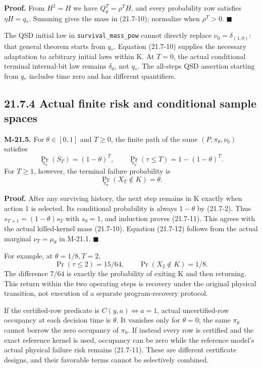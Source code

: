\documentclass[
  english,
  11pt,
  oneside]{book}
\begin{document}
\textbf{Proof.} From \(H^2=H\) we have \(Q_\theta^T=\rho^TH\), and every probability row satisfies \(\eta H=q_*\). Summing gives the mass in (21.7-10); normalize when \(\rho^T>0\). \(\blacksquare\)

The QSD initial law in \nolinkurl{survival_mass_pow} cannot directly replace \(\nu_0=\delta_{(1,0)}\): that general theorem starts from \(q_*\). Equation (21.7-10) supplies the necessary adaptation to arbitrary initial laws within K. At \(T=0\), the actual conditional terminal internal-bit law remains \(\delta_0\), not \(q_*\). The all-steps QSD assertion starting from \(q_*\) includes time zero and has different quantifiers.

\subsection{21.7.4 Actual finite risk and conditional sample spaces}\label{actual-finite-risk-and-conditional-sample-spaces}

\hypertarget{m-21-5}{}\label{m-21-5}

\textbf{M-21.5.} For \(\theta\in[0,1]\) and \(T\ge0\), the finite path of the same \((P,\pi_\theta,\nu_0)\) satisfies \[\Pr_{\pi_\theta}(S_T)=(1-\theta)^T,\qquad
\Pr_{\pi_\theta}(\tau\le T)=1-(1-\theta)^T.           \tag{21.7-11}\] For \(T\ge1\), however, the terminal failure probability is \[\Pr_{\pi_\theta}(X_T\notin K)=\theta.                \tag{21.7-12}\]

\textbf{Proof.} After any surviving history, the next step remains in K exactly when action 1 is selected. Its conditional probability is always \(1-\theta\) by (21.7-2). Thus \(s_{T+1}=(1-\theta)s_T\) with \(s_0=1\), and induction proves (21.7-11). This agrees with the actual killed-kernel mass (21.7-10). Equation (21.7-12) follows from the actual marginal \(\nu_T=\mu_\theta\) in M-21.1. \(\blacksquare\)

For example, at \(\theta=1/8,T=2\), \[\Pr(\tau\le2)=15/64,\qquad \Pr(X_2\notin K)=1/8.\] The difference \(7/64\) is exactly the probability of exiting K and then returning. This return within the two operating steps is recovery under the original physical transition, not execution of a separate program-recovery protocol.

If the certified-row predicate is \(C(y,a)\iff a=1\), actual uncertified-row occupancy at each decision time is \(\theta\). It vanishes only for \(\theta=0\); the same \(\pi_\theta\) cannot borrow the zero occupancy of \(\pi_0\). If instead every row is certified and the exact reference kernel is used, occupancy can be zero while the reference model's actual physical failure risk remains (21.7-11). These are different certificate designs, and their favorable terms cannot be selectively combined.
\end{document}
